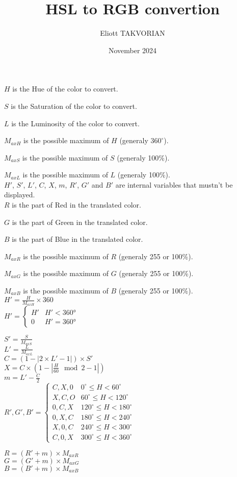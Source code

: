 \documentclass{article}
\title{HSL to RGB convertion}
\author{Eliott TAKVORIAN}
\date{November 2024}
\begin{document}
    $H$ is the Hue of the color to convert.
    
    $S$ is the Saturation of the color to convert.
    
    $L$ is the Luminosity of the color to convert.
    
    $M_{axH}$ is the possible maximum of $H$ (generaly $360^\circ$).

    $M_{axS}$ is the possible maximum of $S$ (generaly 100\%).

    $M_{axL}$ is the possible maximum of $L$ (generaly 100\%).\\

    $H'$, $S'$, $L'$, $C$, $X$, $m$, $R'$, $G'$ and $B'$ are internal variables that mustn't be displayed.\\

    $R$ is the part of Red in the translated color.

    $G$ is the part of Green in the translated color.

    $B$ is the part of Blue in the translated color.

    $M_{axR}$ is the possible maximum of $R$ (generaly 255 or 100\%).

    $M_{axG}$ is the possible maximum of $G$ (generaly 255 or 100\%).

    $M_{axB}$ is the possible maximum of $B$ (generaly 255 or 100\%).\\
    
    $H'=\frac{H}{M_{axH}}\times 360$\\

    $H'=
    \begin{cases}
        H' & H' < 360°\\
        0 & H' = 360°
    \end{cases}$

    $S'=\frac{S}{M_{axS}}$\\

    $L'=\frac{L}{M_{axL}}$\\

    $C=(1-|2\times L'-1|)\times S'$\\

    $X=C\times (1 - |\frac{H}{60}\mod{2} - 1|)$\\

    $m=L'-\frac{C}{2}$\\

    $R', G', B'=
    \begin{cases}
        C, X, 0 & 0^\circ \le H < 60^\circ\\        
        X, C, O & 60^\circ \le H < 120^\circ\\
        0, C, X & 120^\circ \le H < 180^\circ\\
        0, X, C & 180^\circ \le H < 240^\circ\\
        X, 0, C & 240^\circ \le H < 300^\circ\\
        C, 0, X & 300^\circ \le H < 360^\circ
    \end{cases}$
    
    $R=(R'+m)\times M_{axR}$\\
    
    $G=(G'+m)\times M_{axG}$\\
    
    $B=(B'+m)\times M_{axB}$\\
\end{document}
